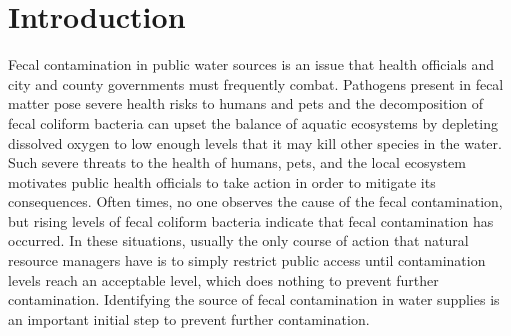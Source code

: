 \chapter{Introduction}\label{chap:introduction}
Fecal contamination in public water sources is an issue that health officials and city and county governments must frequently combat.
Pathogens present in fecal matter pose severe health risks to humans and pets
and
the decomposition of fecal coliform bacteria can upset the balance of aquatic ecosystems by depleting dissolved oxygen to low enough levels that it may kill other species in the water.
Such severe threats to the health of humans, pets, and the local ecosystem motivates public health officials to take action in order to mitigate its consequences.
Often times, no one observes the cause of the fecal contamination, but rising levels of fecal coliform bacteria indicate that fecal contamination has occurred.
In these situations, usually the only course of action that natural resource managers have is to simply restrict public access until contamination levels reach an acceptable level, which does nothing to prevent further contamination.
Identifying the source of fecal contamination in water supplies is an important initial step to prevent further contamination.


